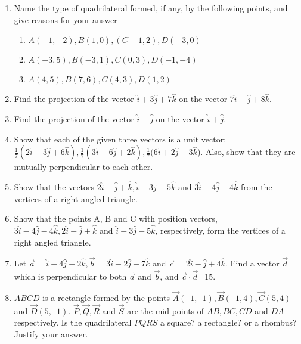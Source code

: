\begin{enumerate}[label=\thesubsection.\arabic*, ref=\thesubsection.\theenumi]
\item Name the type of quadrilateral formed,  if any,  by the following points, and give reasons for your answer
\begin{enumerate}
\item $A(-1, -2),  B(1, 0),  (C-1, 2),  D(-3, 0)$
\item $A(-3, 5),  B(-3, 1),  C(0, 3),  D(-1, -4)$
\item $A(4, 5),  B(7, 6),  C(4, 3),  D(1, 2)$
\end{enumerate}
\solution
		
\item Find the projection of the vector $\hat{i}+3\hat{j}+7\hat{k}$ on the vector $7\hat{i}-\hat{j}+8\hat{k}$.
	\\
	\solution
		
\item Find the projection of the vector $\hat{i}-\hat{j}$ on the vector $\hat{i}+\hat{j}$.
	\\
\solution
		
\item Show that each of the given three vectors is a unit vector: 
 $\frac{1}{7}(2\hat{i}+3\hat{j}+6\hat{k}), \frac{1}{7}(3\hat{i}-6\hat{j}+2\hat{k}), \frac{1}{7}(6\hat{i}+2\hat{j}-3\hat{k}$).
Also, show that they are mutually perpendicular to each other.
	\\
	\solution
		
\item Show that the vectors $2\hat{i}-\hat{j}+\hat{k}, \hat{i}-3\hat{j}-5\hat{k}$ and  $3\hat{i}-4\hat{j}-4\hat{k}$ from the vertices of a right angled triangle.
	\\
	\solution
		
\item Show that the points A,  B and C with position vectors,  $3\hat{i}-4\hat{j}-4\hat{k},  2\hat{i}-\hat{j}+\hat{k}$ and $\hat{i}-3\hat{j}-5\hat{k}$,  respectively,  form the vertices of a right angled
triangle.
\\
\solution
		
\item Let $\vec{a}=\hat{i}+4\hat{j}+2\hat{k},  \vec{b}=3\hat{i}-2\hat{j}+7\hat{k}$ and $\vec{c}=2\hat{i}-\hat{j}+4\hat{k}$. Find a vector $\vec{d}$ which is perpendicular to both $\vec{a}$ and $\vec{b}$,  and $\vec{c}\cdot \vec{d}$=15.\\
	\solution
		
\item $ABCD$ is a rectangle formed by the points $\vec{A}(–1,  –1),  \vec{B}(– 1,  4),  \vec{C}(5,  4)$  and  $\vec{D}(5,  – 1)$. $\vec{P},  \vec{Q},  \vec{R}$ and $\vec{S}$ are the mid-points of $AB,  BC,  CD$ and $DA$ respectively. Is the quadrilateral $PQRS$ a square? a rectangle? or a rhombus? Justify your answer.

\end{enumerate}

